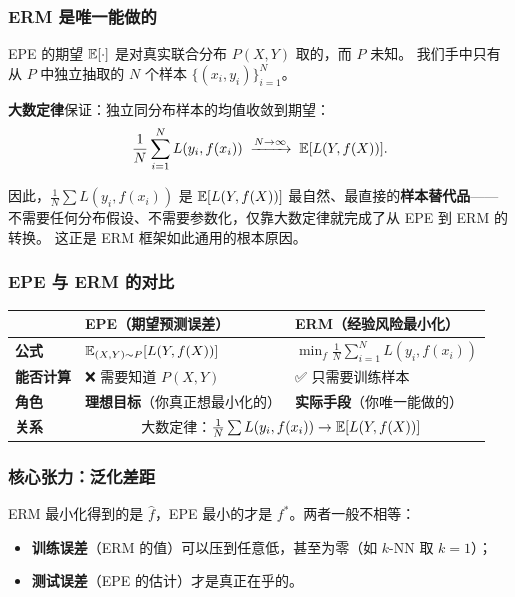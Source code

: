 \subsubsection{ERM 是唯一能做的}

EPE 的期望 $\mathbb{E}[\cdot]$ 是对真实联合分布 $P(X,Y)$ 取的，而 $P$ 未知。
我们手中只有从 $P$ 中独立抽取的 $N$ 个样本 $\{(x_i, y_i)\}_{i=1}^N$。

\textbf{大数定律}保证：独立同分布样本的均值收敛到期望：
\[
\frac{1}{N}\sum_{i=1}^{N} L(y_i, f(x_i)) \;\xrightarrow{N \to \infty}\; \mathbb{E}[L(Y, f(X))].
\]

因此，$\frac{1}{N}\sum L(y_i, f(x_i))$ 是 $\mathbb{E}[L(Y, f(X))]$ 最自然、最直接的\textbf{样本替代品}——
不需要任何分布假设、不需要参数化，仅靠大数定律就完成了从 EPE 到 ERM 的转换。
这正是 ERM 框架如此通用的根本原因。

\subsubsection{EPE 与 ERM 的对比}

\begin{center}
\renewcommand{\arraystretch}{1.5}
\begin{tabular}{p{3cm}|p{6cm}|p{6cm}}
\toprule
& \textbf{EPE（期望预测误差）} & \textbf{ERM（经验风险最小化）} \\
\midrule
\textbf{公式}   & $\mathbb{E}_{(X,Y)\sim P}[L(Y, f(X))]$ & $\min_f \frac{1}{N}\sum_{i=1}^{N} L(y_i, f(x_i))$ \\
\textbf{能否计算} & ❌ 需要知道 $P(X,Y)$ & ✅ 只需要训练样本 \\
\textbf{角色}     & \textbf{理想目标}（你真正想最小化的） & \textbf{实际手段}（你唯一能做的） \\
\textbf{关系}     & \multicolumn{2}{c}{大数定律：$\frac{1}{N}\sum L(y_i, f(x_i)) \to \mathbb{E}[L(Y, f(X))]$} \\
\bottomrule
\end{tabular}
\end{center}

\subsubsection{核心张力：泛化差距}

ERM 最小化得到的是 $\hat{f}$，EPE 最小的才是 $f^*$。两者一般不相等：
\begin{itemize}
    \item \textbf{训练误差}（ERM 的值）可以压到任意低，甚至为零（如 $k$-NN 取 $k=1$）；
    \item \textbf{测试误差}（EPE 的估计）才是真正在乎的。
\end{itemize}

